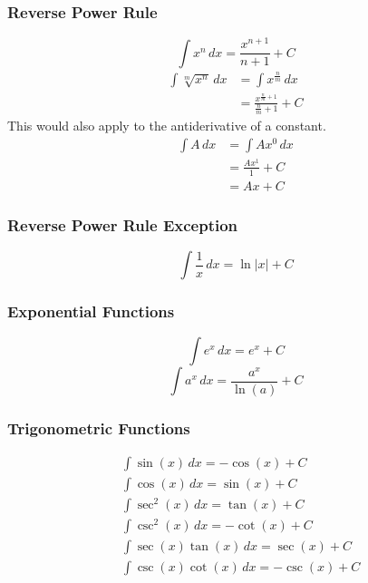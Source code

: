 \documentclass[12pt]{article}
\begin{document}
\subsubsection{Reverse Power Rule}
\[ \int x^n \, dx = \frac{x^{n+1}}{n+1} + C\]
\begin{align*}
	\int \sqrt[m]{x^n} \, dx & = \int x^{\frac{n}{m}} \, dx                      \\[6pt]
	& = \frac{x^{\frac{n}{m} + 1}}{\frac{n}{m} + 1} + C
\end{align*}
\newline
This would also apply to the antiderivative of a constant.
\begin{align*}
	\int A \, dx & = \int Ax^0 \, dx    \\
	& = \frac{Ax^1}{1} + C \\[6pt]
	& = Ax + C
\end{align*}

\subsubsection{Reverse Power Rule Exception}
\[ \int \frac{1}{x} \, dx = \ln |x| + C\]

\subsubsection{Exponential Functions}
\[ \int e^x \, dx = e^x + C \]
\[ \int a^x \, dx = \frac{a^x}{\ln(a)} + C \]

\subsubsection{Trigonometric Functions}
\begin{align*}
	& \int \sin(x) \, dx = -\cos(x) + C        \\[6pt]
	& \int \cos(x) \, dx = \sin(x) + C         \\[6pt]
	& \int \sec^2(x) \, dx = \tan(x) + C       \\[6pt]
	& \int \csc^2(x) \, dx = -\cot(x) + C      \\[6pt]
	& \int \sec(x)\tan(x) \, dx = \sec(x) + C  \\[6pt]
	& \int \csc(x)\cot(x) \, dx = -\csc(x) + C
\end{align*}
\end{document}

